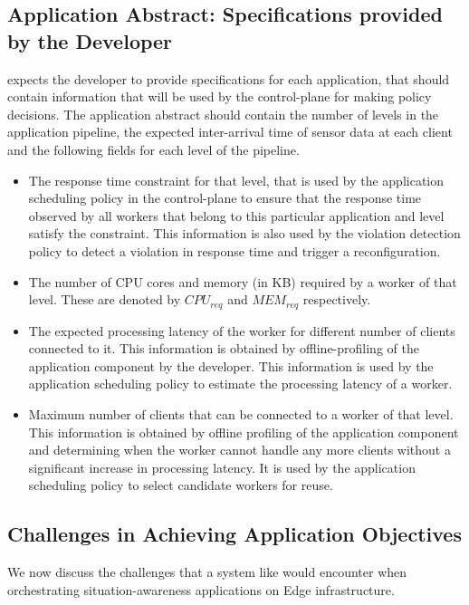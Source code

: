 \subsection{Application Abstract: Specifications provided by the Developer}
\oneedge{} expects the developer to provide specifications for each application, that should contain information that will be used by the control-plane for making policy decisions. The application abstract should contain the number of levels in the application pipeline, the expected inter-arrival time of sensor data at each client and the following fields for each level of the pipeline.
\begin{itemize}
\item The response time constraint for that level, that is used by the application scheduling policy in the control-plane to ensure that the response time observed by all workers that belong to this particular application and level satisfy the constraint. This information is also used by the violation detection policy to detect a violation in response time and trigger a reconfiguration.
\item The number of CPU cores and memory (in KB) required by a worker of that level. These are denoted by $CPU_{req}$ and $MEM_{req}$ respectively.
\item The expected processing latency of the worker for different number of clients connected to it. This information is obtained by offline-profiling of the application component by the developer. This information is used by the application scheduling policy to estimate the processing latency of a worker.
\item Maximum number of clients that can be connected to a worker of that level. This information is obtained by offline profiling of the application component and determining when the worker cannot handle any more clients without a significant increase in processing latency. It is used by the application scheduling policy to select candidate workers for reuse.
\end{itemize}

\subsection{Challenges in Achieving Application Objectives}
We now discuss the challenges that a system like \oneedge{} would encounter when orchestrating situation-awareness applications on Edge infrastructure.
